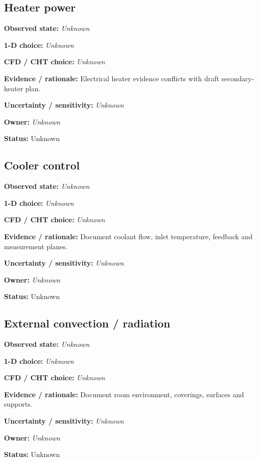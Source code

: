 \documentclass[11pt]{article}
\begin{document}
\begin{minipage}{\textwidth}\small\setlength{\parskip}{2pt}
\subsection*{Heater power}
\textbf{Observed state:} \textit{Unknown}\par
\textbf{1-D choice:} \textit{Unknown}\par
\textbf{CFD / CHT choice:} \textit{Unknown}\par
\textbf{Evidence / rationale:} Electrical heater evidence conflicts with draft secondary-heater plan.\par
\textbf{Uncertainty / sensitivity:} \textit{Unknown}\par
\textbf{Owner:} \textit{Unknown}\par
\textbf{Status:} Unknown\par
\end{minipage}\par\vspace{5pt}
\begin{minipage}{\textwidth}\small\setlength{\parskip}{2pt}
\subsection*{Cooler control}
\textbf{Observed state:} \textit{Unknown}\par
\textbf{1-D choice:} \textit{Unknown}\par
\textbf{CFD / CHT choice:} \textit{Unknown}\par
\textbf{Evidence / rationale:} Document coolant flow, inlet temperature, feedback and measurement planes.\par
\textbf{Uncertainty / sensitivity:} \textit{Unknown}\par
\textbf{Owner:} \textit{Unknown}\par
\textbf{Status:} Unknown\par
\end{minipage}\par\vspace{5pt}
\begin{minipage}{\textwidth}\small\setlength{\parskip}{2pt}
\subsection*{External convection / radiation}
\textbf{Observed state:} \textit{Unknown}\par
\textbf{1-D choice:} \textit{Unknown}\par
\textbf{CFD / CHT choice:} \textit{Unknown}\par
\textbf{Evidence / rationale:} Document room environment, coverings, surfaces and supports.\par
\textbf{Uncertainty / sensitivity:} \textit{Unknown}\par
\textbf{Owner:} \textit{Unknown}\par
\textbf{Status:} Unknown\par
\end{minipage}\par\vspace{5pt}
\end{document}
